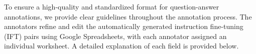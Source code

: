 To ensure a high-quality and standardized format for question-answer annotations, we provide clear guidelines throughout the annotation process. The annotators refine and edit the automatically generated instruction fine-tuning (IFT) pairs using Google Spreadsheets, with each annotator assigned an individual worksheet. A detailed explanation of each field is provided below.
